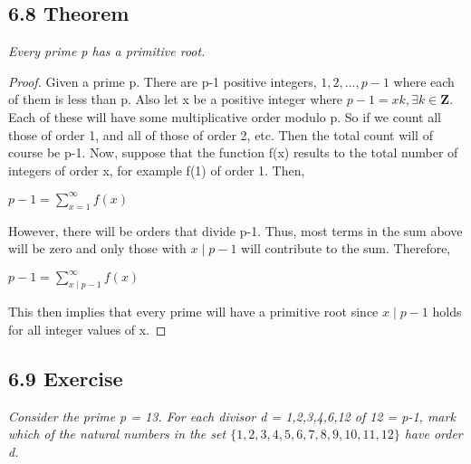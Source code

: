 \documentclass{article}
\begin{document}
\subsection*{6.8 Theorem} 
\quad \textit{Every prime p has a primitive root.}

\begin{proof}
Given a prime p. There are p-1 positive integers, $1,2,...,p-1$ where each of them is less than p. Also let x be a positive integer where $p-1 = xk, \exists k \in \mathbf{Z}$. Each of these will have some multiplicative order modulo p. So if we count all those of order 1, and all of those of order 2, etc. Then the total count will of course be p-1. Now, suppose that the function f(x) results to the total number of integers of order x, for example f(1) of order 1. Then,
\begin{center}
    $p-1 = \sum_{x=1}^\infty f(x)$
\end{center}
However, there will be orders that divide p-1. Thus, most terms in the sum above will be zero and only those with $x \mid p-1$ will contribute to the sum. Therefore, 
\begin{center}
    $p-1 = \sum_{x \mid p-1}^\infty f(x)$
\end{center}
This then implies that every prime will have a primitive root since $x \mid p-1$ holds for all integer values of x.
\end{proof}

\subsection*{6.9 Exercise} 
\quad \textit{Consider the prime p = 13. For each divisor d = 1,2,3,4,6,12 of 12 = p-1, mark which of the natural numbers in the set $\{1,2,3,4,5,6,7,8,9,10,11,12\}$ have order d.}
\end{document}
